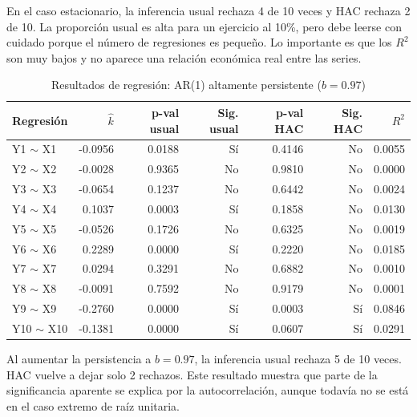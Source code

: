 \documentclass[11pt,a4paper]{article}
\begin{document}
En el caso estacionario, la inferencia usual rechaza 4 de 10 veces y HAC rechaza 2 de 10. La proporción usual es alta para un ejercicio al 10\%, pero debe leerse con cuidado porque el número de regresiones es pequeño. Lo importante es que los $R^2$ son muy bajos y no aparece una relación económica real entre las series.

\begin{table}[H]
\centering
\caption{Resultados de regresión: AR(1) altamente persistente ($b=0.97$)}
\scriptsize
\begin{tabular}{lrrrrrr}
\toprule
Regresión & $\hat{k}$ & p-val usual & Sig. usual & p-val HAC & Sig. HAC & $R^2$ \\
\midrule
Y1 $\sim$ X1 & -0.0956 & 0.0188 & Sí & 0.4146 & No & 0.0055 \\
Y2 $\sim$ X2 & -0.0028 & 0.9365 & No & 0.9810 & No & 0.0000 \\
Y3 $\sim$ X3 & -0.0654 & 0.1237 & No & 0.6442 & No & 0.0024 \\
Y4 $\sim$ X4 & 0.1037 & 0.0003 & Sí & 0.1858 & No & 0.0130 \\
Y5 $\sim$ X5 & -0.0526 & 0.1726 & No & 0.6325 & No & 0.0019 \\
Y6 $\sim$ X6 & 0.2289 & 0.0000 & Sí & 0.2220 & No & 0.0185 \\
Y7 $\sim$ X7 & 0.0294 & 0.3291 & No & 0.6882 & No & 0.0010 \\
Y8 $\sim$ X8 & -0.0091 & 0.7592 & No & 0.9179 & No & 0.0001 \\
Y9 $\sim$ X9 & -0.2760 & 0.0000 & Sí & 0.0003 & Sí & 0.0846 \\
Y10 $\sim$ X10 & -0.1381 & 0.0000 & Sí & 0.0607 & Sí & 0.0291 \\
\bottomrule
\end{tabular}
\end{table}

Al aumentar la persistencia a $b=0.97$, la inferencia usual rechaza 5 de 10 veces. HAC vuelve a dejar solo 2 rechazos. Este resultado muestra que parte de la significancia aparente se explica por la autocorrelación, aunque todavía no se está en el caso extremo de raíz unitaria.
\end{document}
